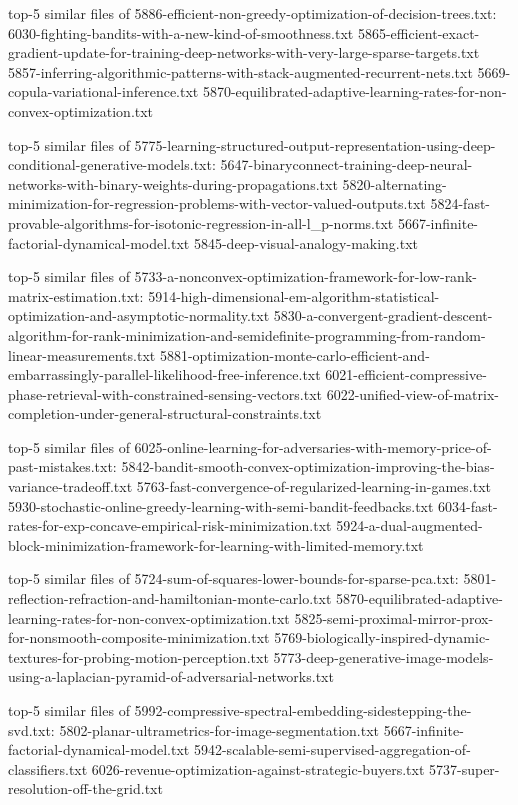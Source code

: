 \documentclass[11pt]{article}
\begin{document}
top-5 similar files of
5886-efficient-non-greedy-optimization-of-decision-trees.txt:
6030-fighting-bandits-with-a-new-kind-of-smoothness.txt
5865-efficient-exact-gradient-update-for-training-deep-networks-with-very-large-sparse-targets.txt
5857-inferring-algorithmic-patterns-with-stack-augmented-recurrent-nets.txt
5669-copula-variational-inference.txt
5870-equilibrated-adaptive-learning-rates-for-non-convex-optimization.txt

top-5 similar files of
5775-learning-structured-output-representation-using-deep-conditional-generative-models.txt:
5647-binaryconnect-training-deep-neural-networks-with-binary-weights-during-propagations.txt
5820-alternating-minimization-for-regression-problems-with-vector-valued-outputs.txt
5824-fast-provable-algorithms-for-isotonic-regression-in-all-l\_p-norms.txt
5667-infinite-factorial-dynamical-model.txt
5845-deep-visual-analogy-making.txt

top-5 similar files of
5733-a-nonconvex-optimization-framework-for-low-rank-matrix-estimation.txt:
5914-high-dimensional-em-algorithm-statistical-optimization-and-asymptotic-normality.txt
5830-a-convergent-gradient-descent-algorithm-for-rank-minimization-and-semidefinite-programming-from-random-linear-measurements.txt
5881-optimization-monte-carlo-efficient-and-embarrassingly-parallel-likelihood-free-inference.txt
6021-efficient-compressive-phase-retrieval-with-constrained-sensing-vectors.txt
6022-unified-view-of-matrix-completion-under-general-structural-constraints.txt

top-5 similar files of
6025-online-learning-for-adversaries-with-memory-price-of-past-mistakes.txt:
5842-bandit-smooth-convex-optimization-improving-the-bias-variance-tradeoff.txt
5763-fast-convergence-of-regularized-learning-in-games.txt
5930-stochastic-online-greedy-learning-with-semi-bandit-feedbacks.txt
6034-fast-rates-for-exp-concave-empirical-risk-minimization.txt
5924-a-dual-augmented-block-minimization-framework-for-learning-with-limited-memory.txt

top-5 similar files of
5724-sum-of-squares-lower-bounds-for-sparse-pca.txt:
5801-reflection-refraction-and-hamiltonian-monte-carlo.txt
5870-equilibrated-adaptive-learning-rates-for-non-convex-optimization.txt
5825-semi-proximal-mirror-prox-for-nonsmooth-composite-minimization.txt
5769-biologically-inspired-dynamic-textures-for-probing-motion-perception.txt
5773-deep-generative-image-models-using-a-laplacian-pyramid-of-adversarial-networks.txt

top-5 similar files of
5992-compressive-spectral-embedding-sidestepping-the-svd.txt:
5802-planar-ultrametrics-for-image-segmentation.txt
5667-infinite-factorial-dynamical-model.txt
5942-scalable-semi-supervised-aggregation-of-classifiers.txt
6026-revenue-optimization-against-strategic-buyers.txt
5737-super-resolution-off-the-grid.txt
\end{document}
